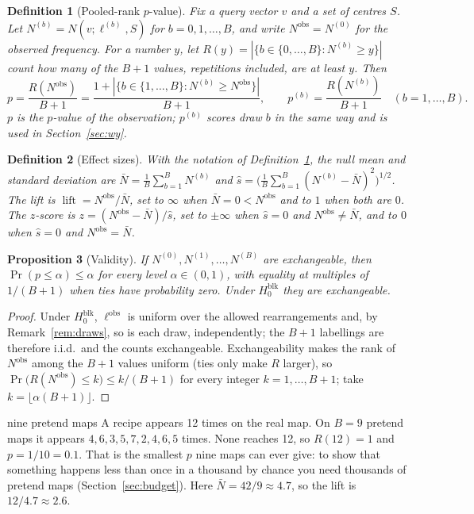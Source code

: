 \documentclass[11pt,a4paper]{article}
\newtheorem{definition}{Definition}[section]
\newtheorem{proposition}[definition]{Proposition}
\theoremstyle{remark}
\newcommand{\lab}{\ell}
\newcommand{\obs}{\mathrm{obs}}
\newcommand{\lift}{\operatorname{lift}}
\begin{document}
\begin{definition}[Pooled-rank $p$-value]
\label{def:p}
Fix a query vector $v$ and a set of centres $S$. Let
$N^{(b)}=N(v;\lab^{(b)},S)$ for $b=0,1,\dots,B$, and write
$N^{\obs}=N^{(0)}$ for the observed frequency. For a number $y$, let
$R(y)=|\{b\in\{0,\dots,B\}:N^{(b)}\ge y\}|$ count how many of the $B+1$
values, repetitions included, are at least $y$. Then
\[
  p=\frac{R(N^{\obs})}{B+1}=\frac{1+|\{b\in\{1,\dots,B\}:N^{(b)}\ge N^{\obs}\}|}{B+1},
  \qquad
  p^{(b)}=\frac{R(N^{(b)})}{B+1}\quad(b=1,\dots,B).
\]
$p$ is the $p$-value of the observation; $p^{(b)}$ scores draw $b$ in the same
way and is used in Section~\ref{sec:wy}.
\end{definition}

\begin{definition}[Effect sizes]
\label{def:effect}
With the notation of Definition~\ref{def:p}, the null mean and standard
deviation are $\bar N=\frac1B\sum_{b=1}^B N^{(b)}$ and
$\hat s=\bigl(\frac1B\sum_{b=1}^B(N^{(b)}-\bar N)^2\bigr)^{1/2}$. The
\emph{lift} is $\lift=N^{\obs}/\bar N$, set to $\infty$ when
$\bar N=0<N^{\obs}$ and to $1$ when both are $0$. The \emph{$z$-score} is
$z=(N^{\obs}-\bar N)/\hat s$, set to $\pm\infty$ when $\hat s=0$ and
$N^{\obs}\ne\bar N$, and to $0$ when $\hat s=0$ and $N^{\obs}=\bar N$.
\end{definition}

\begin{proposition}[Validity]
\label{prop:valid}
If $N^{(0)},N^{(1)},\dots,N^{(B)}$ are exchangeable, then
$\Pr(p\le\alpha)\le\alpha$ for every level $\alpha\in(0,1)$, with equality at
multiples of $1/(B+1)$ when ties have probability zero. Under
$H_0^{\mathrm{blk}}$ they are exchangeable.
\end{proposition}

\begin{proof}
Under $H_0^{\mathrm{blk}}$, $\lab^{\obs}$ is uniform over the allowed
rearrangements and, by Remark~\ref{rem:draws}, so is each draw, independently;
the $B+1$ labellings are therefore i.i.d.\ and the counts exchangeable.
Exchangeability makes the rank of $N^{\obs}$ among the $B+1$ values uniform
(ties only make $R$ larger), so $\Pr\bigl(R(N^{\obs})\le k\bigr)\le k/(B+1)$ for
every integer $k=1,\dots,B+1$; take $k=\lfloor\alpha(B+1)\rfloor$.
\end{proof}

\begin{example}{nine pretend maps}
A recipe appears 12 times on the real map. On $B=9$ pretend maps it appears
$4,6,3,5,7,2,4,6,5$ times. None reaches 12, so $R(12)=1$ and
$p=1/10=0.1$. That is the smallest $p$ nine maps can ever give: to show that
something happens less than once in a thousand by chance you need thousands of
pretend maps (Section~\ref{sec:budget}). Here $\bar N=42/9\approx4.7$, so the
lift is $12/4.7\approx2.6$.
\end{example}
\end{document}
